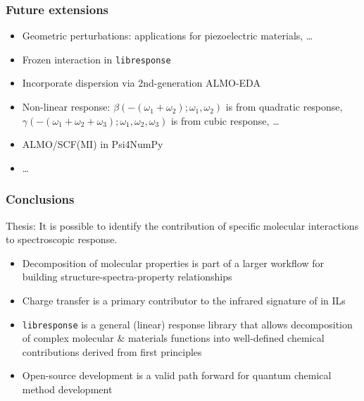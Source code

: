 \documentclass[%
    xcolor=usenames,dvipsnames,svgnames%
]{beamer}
\newcommand\pfn{Psi4NumPy}
\newcommand\libresponse{\texttt{libresponse}}
\begin{document}
\begin{frame}
  \frametitle{Future extensions}
  \begin{itemize}
  \item Geometric perturbations: applications for piezoelectric materials, \dots
  \item Frozen interaction in \libresponse{}
  \item Incorporate dispersion via 2nd-generation ALMO-EDA
  \item Non-linear response: \(\beta(-(\omega_{1}+\omega_{2});\omega_{1},\omega_{2})\) is from quadratic response, \(\gamma(-(\omega_{1}+\omega_{2}+\omega_{3});\omega_{1},\omega_{2},\omega_{3})\) is from cubic response, \dots
  \item ALMO/SCF(MI) in \pfn{}
  \item \dots
  \end{itemize}
\end{frame}

\begin{frame}
  \frametitle{Conclusions}
  Thesis: It is possible to identify the contribution of specific molecular interactions to spectroscopic response.
  \begin{itemize}
  \item Decomposition of molecular properties is part of a larger workflow for building structure-spectra-property relationships
  \item Charge transfer is a primary contributor to the infrared signature of  in ILs
  \item \libresponse{} is a general (linear) response library that allows decomposition of complex molecular \& materials functions into well-defined chemical contributions derived from first principles
  \item Open-source development is a valid path forward for quantum chemical method development
  \end{itemize}
\end{frame}
\end{document}
